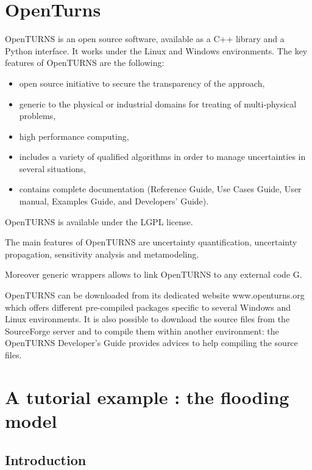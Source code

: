 \documentclass{article}
\begin{document}


\section{OpenTurns}

OpenTURNS\cite{Baudin2016,OTurl,OpenTURNSUncecomp17} is an open source software, available as a 
C++ library and a Python interface. 
It works under the Linux and Windows environments. 
The key features of OpenTURNS are the following:
\begin{itemize}
\item open source initiative to secure the transparency of the approach,
\item generic to the physical or industrial domains for treating of multi-physical problems,
\item high performance computing,
\item includes a variety of qualified algorithms in order to manage uncertainties in several situations,
\item contains complete documentation (Reference Guide, Use Cases Guide, User manual, Examples Guide, and Developers' Guide).
\end{itemize}
OpenTURNS is available under the LGPL license. 

The main features of OpenTURNS are uncertainty quantification, uncertainty propagation, 
sensitivity analysis and metamodeling. 

Moreover generic wrappers allows to link OpenTURNS to any external code G.

OpenTURNS can be downloaded from its dedicated website www.openturns.org which offers different 
pre-compiled packages specific to several Windows and Linux environments. It is also possible to 
download the source files from the SourceForge server and to compile them within another 
environment: the OpenTURNS Developer's Guide provides advices to help compiling the source files.


\section{A tutorial example : the flooding model}

\subsection{Introduction}
\end{document}
